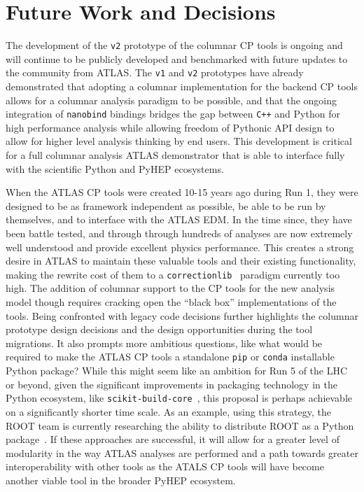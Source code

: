 \section{Future Work and Decisions}\label{sec:conclusions}

The development of the \texttt{v2} prototype of the columnar CP tools is ongoing and will continue to be publicly developed and benchmarked with future updates to the community from ATLAS.
The \texttt{v1} and \texttt{v2} prototypes have already demonstrated that adopting a columnar implementation for the backend CP tools allows for a columnar analysis paradigm to be possible, and that the ongoing integration of \texttt{nanobind} bindings bridges the gap between \texttt{C++} and Python for high performance analysis while allowing freedom of Pythonic API design to allow for higher level analysis thinking by end users.
This development is critical for a full columnar analysis ATLAS demonstrator that is able to interface fully with the scientific Python and PyHEP ecosystems.

When the ATLAS CP tools were created 10-15 years ago during Run 1, they were designed to be as framework independent as possible, be able to be run by themselves, and to interface with the ATLAS EDM.
In the time since, they have been battle tested, and through through hundreds of analyses are now extremely well understood and provide excellent physics performance.
This creates a strong desire in ATLAS to maintain these valuable tools and their existing functionality, making the rewrite cost of them to a \texttt{correctionlib}~\cite{correctionlib_2024} paradigm currently too high.
The addition of columnar support to the CP tools for the new analysis model though requires cracking open the ``black box'' implementations of the tools.
Being confronted with legacy code decisions further highlights the columnar prototype design decisions and the design opportunities during the tool migrations.
It also prompts more ambitious questions, like what would be required to make the ATLAS CP tools a standalone \texttt{pip} or \texttt{conda} installable Python package?
While this might seem like an ambition for Run 5 of the LHC or beyond, given the significant improvements in packaging technology in the Python ecosystem, like \texttt{scikit-build-core}~\cite{Schreiner_Scikit-build-core_2024}, this proposal is perhaps achievable on a significantly shorter time scale.
As an example, using this strategy, the ROOT team is currently researching the ability to distribute ROOT as a Python package~\cite{Padulano:CHEP_2024}.
If these approaches are successful, it will allow for a greater level of modularity in the way ATLAS analyses are performed and a path towards greater interoperability with other tools as the ATALS CP tools will have become another viable tool in the broader PyHEP ecosystem.
